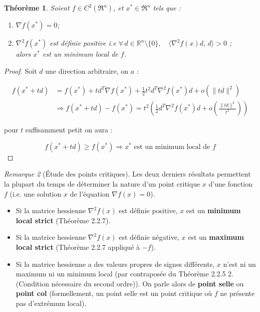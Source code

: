 \documentclass[a4paper,12pt,openany]{book}
\theoremstyle{plain}
\newtheorem{theorem}{Théorème}[section]
\theoremstyle{definition}
\theoremstyle{remark}
\newtheorem{remark}[theorem]{Remarque}
\theoremstyle{nbstyle}
\begin{document}
	\begin{theorem} Soient $f \in C^{2}\left(\Re^{n}\right)$, et $x^{*} \in \Re^{n}$ tels que :
		
		\begin{enumerate}
			\item $\nabla f\left(x^{*}\right)=0$;
			\item $\nabla^{2} f\left(x^{*}\right)$ est définie positive i.e \(
			\forall\, d \in \mathbb{R}^n \setminus \{0\}, \quad 
			\langle \nabla^2 f(x)d,\, d \rangle > 0
			\)
			;\\
			alors $x^{*}$ est un minimum local de $f$.
		\end{enumerate}
	\end{theorem}
	\begin{proof}
		Soit $d$ une direction arbitraire, on $a$ :
		
		$$
		\begin{aligned}
		f\left(x^{*}+t d\right) & =f\left(x^{*}\right)+t d^{T} \nabla f\left(x^{*}\right)+\frac{1}{2} t^{2} d^{T} \nabla^{2} f\left(x^{*}\right) d+o\left(\|t d\|^{2}\right) \\
		& \Longrightarrow f\left(x^{*}+t d\right)-f\left(x^{*}\right)=t^{2}\left(\frac{1}{2} d^{T} \nabla^{2} f\left(x^{*}\right) d+o\left(\frac{\|t d\|^{2}}{t^{2}}\right)\right)
		\end{aligned}
		$$
		
		pour $t$ suffisamment petit on aura :
		
		$$
		f\left(x^{*}+t d\right) \geq f\left(x^{*}\right) \Longrightarrow x^{*} \text { est un minimum local de } f
		$$
	\end{proof}
	
	\begin{remark}[Étude des points critiques]\label{rem:points-critiques}
		Les deux derniers résultats permettent la plupart du temps de déterminer la nature d’un point critique
		$x$ d’une fonction $f$ (i.e. une solution $x$ de l’équation $\nabla f(x) = 0$).
		
		\begin{itemize}
			\item Si la matrice hessienne $\nabla^2 f(x)$ est définie positive, $x$ est un \textbf{minimum local strict} (Théorème 2.2.7).
			\item Si la matrice hessienne $\nabla^2 f(x)$ est définie négative, $x$ est un \textbf{maximum local strict} (Théorème 2.2.7 appliqué à $-f$).
			\item Si la matrice hessienne a des valeurs propres de signes différents, $x$ n’est ni un maximum ni un minimum local (par contraposée du Théorème 2.2.5 2.(Condition nécessaire du second ordre)). On parle alors de \textbf{point selle} ou \textbf{point col} (formellement, un point selle est un point critique où $f$ ne présente pas d’extrémum local).
		\end{itemize}
	\end{remark}
	
\end{document}
